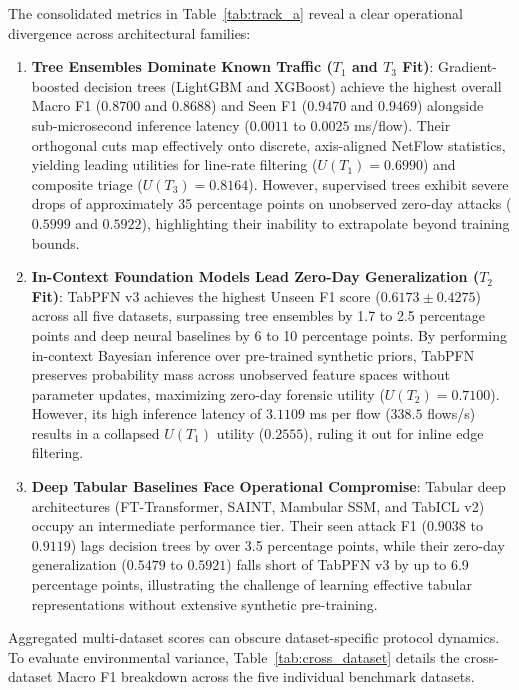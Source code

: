 \documentclass[10pt,a4paper]{article}
\begin{document}
The consolidated metrics in Table~\ref{tab:track_a} reveal a clear operational divergence across architectural families:
\begin{enumerate}
    \item \textbf{Tree Ensembles Dominate Known Traffic ($T_1$ and $T_3$ Fit)}: Gradient-boosted decision trees (LightGBM and XGBoost) achieve the highest overall Macro F1 ($0.8700$ and $0.8688$) and Seen F1 ($0.9470$ and $0.9469$) alongside sub-microsecond inference latency ($0.0011$ to $0.0025$ ms/flow). Their orthogonal cuts map effectively onto discrete, axis-aligned NetFlow statistics, yielding leading utilities for line-rate filtering ($U(T_1) = 0.6990$) and composite triage ($U(T_3) = 0.8164$). However, supervised trees exhibit severe drops of approximately 35 percentage points on unobserved zero-day attacks ($0.5999$ and $0.5922$), highlighting their inability to extrapolate beyond training bounds.
    \item \textbf{In-Context Foundation Models Lead Zero-Day Generalization ($T_2$ Fit)}: TabPFN v3 achieves the highest Unseen F1 score ($0.6173 \pm 0.4275$) across all five datasets, surpassing tree ensembles by 1.7 to 2.5 percentage points and deep neural baselines by 6 to 10 percentage points. By performing in-context Bayesian inference over pre-trained synthetic priors, TabPFN preserves probability mass across unobserved feature spaces without parameter updates, maximizing zero-day forensic utility ($U(T_2) = 0.7100$). However, its high inference latency of $3.1109$ ms per flow ($338.5$ flows/s) results in a collapsed $U(T_1)$ utility ($0.2555$), ruling it out for inline edge filtering.
    \item \textbf{Deep Tabular Baselines Face Operational Compromise}: Tabular deep architectures (FT-Transformer, SAINT, Mambular SSM, and TabICL v2) occupy an intermediate performance tier. Their seen attack F1 ($0.9038$ to $0.9119$) lags decision trees by over 3.5 percentage points, while their zero-day generalization ($0.5479$ to $0.5921$) falls short of TabPFN v3 by up to 6.9 percentage points, illustrating the challenge of learning effective tabular representations without extensive synthetic pre-training.
\end{enumerate}

Aggregated multi-dataset scores can obscure dataset-specific protocol dynamics. To evaluate environmental variance, Table~\ref{tab:cross_dataset} details the cross-dataset Macro F1 breakdown across the five individual benchmark datasets.
\end{document}
